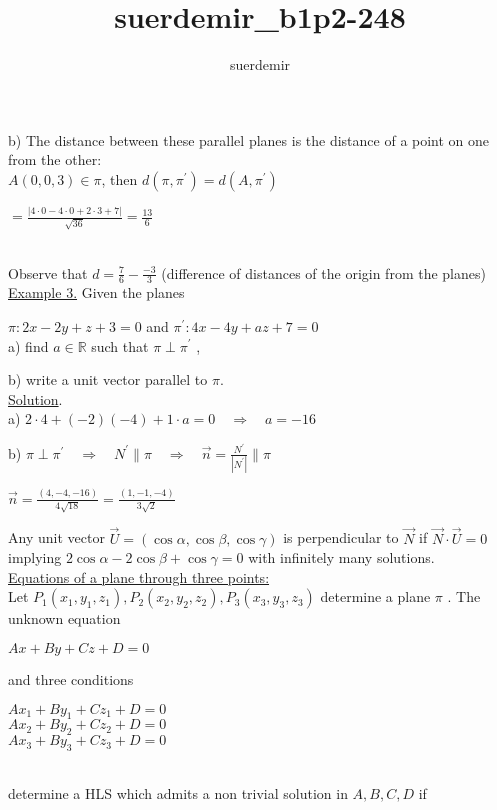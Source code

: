 \documentclass[11pt]{amsbook}
\title{suerdemir_b1p2-248}
\author{suerdemir}
\newcommand\ddfrac[2]{\frac{\displaystyle #1}{\displaystyle #2}}
\begin{document}

b) The distance between these parallel planes is the distance of a point \hspace{5cm} on one from the other:\\

$ A(0, 0, 3) \in \pi $, \quad then \quad $ d(\pi, \pi^{'}) = d(A, \pi^{'}) $ \\

\begin{center}
	$ = \ddfrac{|4\cdot0 - 4\cdot0 + 2\cdot3 + 7|}{\sqrt{36}} = \ddfrac{13}{6} $
\end{center}\\

Observe that $ d = \frac{7}{6} - \frac{-3}{3} $ (difference of distances of the origin from the planes)\\

\underline{Example 3.} Given the planes

$ \pi: 2x - 2y + z + 3 = 0 $ and $ \pi^{'}: 4x - 4y + az + 7 = 0 $ \\

a) find $ a \in \mathbb{R} $ such that $ \pi \perp \pi^{'} $ ,

b) write a unit vector parallel to $ \pi $.\\

\underline{Solution}.\\

a) $ 2\cdot4 + (-2)(-4) + 1 \cdot a = 0 \quad \Rightarrow \quad a = -16 $

b) $ \pi \perp \pi^{'} \quad \Rightarrow \quad N^{'} \parallel \pi \quad \Rightarrow \quad
\vec{n} = \ddfrac{N^{'}}{|N^{'}|} \parallel \pi $\\

\begin{center}
	$ \vec{n} = \ddfrac{(4, -4, -16)}{4\sqrt{18}} = \ddfrac{(1, -1, -4)}{3\sqrt{2}} $
\end{center}

Any unit vector $ \vec{U} = (\cos{\alpha}, \cos{\beta}, \cos{\gamma}) $ is perpendicular to $ \vec{N} $
if $ \vec{N} \cdot \vec{U} = 0 $ implying $ 2\cos{\alpha} - 2\cos{\beta} + \cos{\gamma} = 0 $ with
infinitely many solutions.\\

\underline{Equations of a plane through three points:}\\

Let $ P_1(x_1, y_1, z_1), P_2(x_2, y_2, z_2), P_3(x_3, y_3, z_3) $ determine a plane $\pi$ . The unknown equation

\begin{center}
	$ Ax + By+ Cz + D = 0 $
\end{center}

and three conditions

\begin{center}
	$ Ax_1 + By_1 + Cz_1 + D = 0 $\\
	$ Ax_2 + By_2 + Cz_2 + D = 0 $\\
	$ Ax_3 + By_3 + Cz_3 + D = 0 $
\end{center}\\

determine a HLS which admits a non trivial solution in $ A, B, C, D $ if
\end{document}

